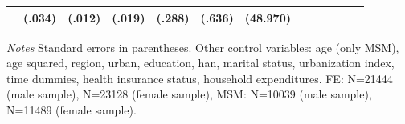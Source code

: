 \begin{table}[p]
\begin{adjustbox}{max width=\linewidth, center}
\begin{threeparttable}
{\begin{tabular}{l*{6}{S
S}}
                &   (.034)         &   (.012)         &   (.019)         &   (.288)         &   (.636)         & (48.970)         \\                                      
\bottomrule
\end{tabular}
\begin{tablenotes}
\item \textit{Notes}   Standard errors in parentheses.
Other control variables: age (only MSM), age squared, region, urban, education, han, marital status, urbanization index, time dummies, health insurance status, household expenditures. FE:  N=21444 (male sample), N=23128 (female sample), MSM: N=10039 (male sample), N=11489 (female sample).
\end{tablenotes}
}
\end{threeparttable}
\end{adjustbox}
\end{table}

\clearpage


